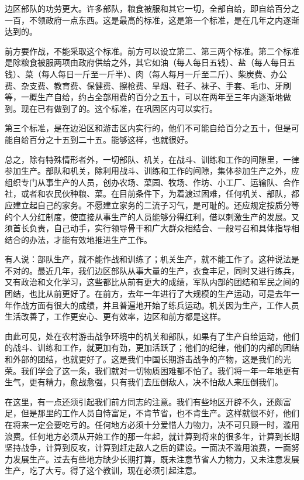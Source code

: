 边区部队的功劳更大。许多部队，粮食被服和其它一切，全部自给，即自给百分之一百，不领政府一点东西。这是最高的标准，这是第一个标准，是在几年之内逐渐达到的。

前方要作战，不能采取这个标准。前方可以设立第二、第三两个标准。第二个标准是除粮食被服两项由政府供给之外，其它如油（每人每日五钱）、盐（每人每日五钱）、菜（每人每日一斤至一斤半）、肉（每人每月一斤至二斤）、柴炭费、办公费、杂支费、教育费、保健费、擦枪费、旱烟、鞋子、袜子、手套、毛巾、牙刷等，一概生产自给，约占全部用费的百分之五十，可以在两年至三年内逐渐地做到。现在已有做到了的。这个标准，在巩固区内可以实行。

第三个标准，是在边沿区和游击区内实行的，他们不可能自给百分之五十，但是可能自给百分之十五到二十五。能够这样，也就很好。

总之，除有特殊情形者外，一切部队、机关，在战斗、训练和工作的间隙里，一律参加生产。部队和机关，除利用战斗、训练和工作的间隙，集体参加生产之外，应组织专门从事生产的人员，创办农场、菜园、牧场、作坊、小工厂、运输队、合作社，或者和农民伙种粮、菜。在目前条件下，为着渡过困难，任何机关、部队，都应建立起自己的家务。不愿建立家务的二流子习气，是可耻的。还应规定按质分等的个人分红制度，使直接从事生产的人员能够分得红利，借以刺激生产的发展。又须首长负责，自己动手，实行领导骨干和广大群众相结合、一般号召和具体指导相结合的办法，才能有效地推进生产工作。

有人说：部队生产，就不能作战和训练了；机关生产，就不能工作了。这种说法是不对的。最近几年，我们边区部队从事大量的生产，衣食丰足，同时又进行练兵，又有政治和文化学习，这些都比从前有更大的成绩，军队内部的团结和军民之间的团结，也比从前更好了。在前方，去年一年进行了大规模的生产运动，可是去年一年作战方面有很大的成绩，并且普遍地开始了练兵运动。机关因为生产，工作人员生活改善了，工作更安心、更有效率，边区和前方都是这样。

由此可见，处在农村游击战争环境中的机关和部队，如果有了生产自给运动，他们的战斗、训练和工作，就更加有劲，更加活跃了；他们的纪律，他们的内部的团结和外部的团结，也就更好了。这是我们中国长期游击战争的产物，这是我们的光荣。我们学会了这一条，我们就对一切物质困难都不怕了。我们将一年一年地更有生气，更有精力，愈战愈强，只有我们去压倒敌人，决不怕敌人来压倒我们。

在这里，有一点还须引起我们前方同志的注意。我们有些地区开辟不久，还颇富足，但是那里的工作人员自恃富足，不肯节省，也不肯生产。这样就很不好，他们在将来一定会要吃亏的。任何地方必须十分爱惜人力物力，决不可只顾一时，滥用浪费。任何地方必须从开始工作的那一年起，就计算到将来的很多年，计算到长期坚持战争，计算到反攻，计算到赶走敌人之后的建设。一面决不滥用浪费，一面努力发展生产。过去有些地方缺少长期打算，既未注意节省人力物力，又未注意发展生产，吃了大亏。得了这个教训，现在必须引起注意。

